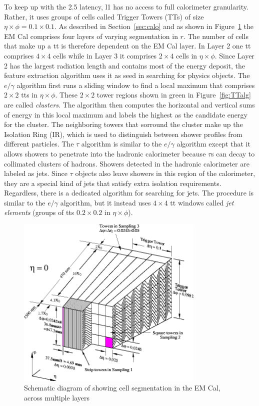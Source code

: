 \par To keep up with the \SI{2.5}{\micron} latency, \acrshort{l1} has no access to full calorimeter granularity.
Rather, it uses groups of cells called Trigger Towers (TTs) of size $\eta\times\phi = 0.1\times0.1$. 
As described in Section~\ref{sec:calo} and as shown in Figure~\ref{fig:emCalSeg} the EM Cal 
comprises four layers of varying segmentation in $r$. The number of cells that make up a \acrshort{tt} 
is therefore dependent on the EM Cal layer. In Layer 2 one \acrshort{tt} comprises $4\times 4$ cells while in 
Layer 3 it comprises $2\times 4$ cells in $\eta\times\phi$. Since Layer 2 has the largest radiation length and 
contains most of the energy deposit, the feature extraction algorithm uses it as seed in searching for physics 
objects. The $e/\gamma$ algorithm first runs a sliding window to 
find a local maximum that comprises $2\times 2$ \acrshort{tt}s in $\eta\times\phi$. 
These $2\times 2$ tower regions shown in green in Figure~\ref{fig:TTalg} 
are called {\it clusters}. The algorithm then computes the horizontal and vertical sums of energy 
in this local maximum and labels the highest as the candidate energy for the cluster. 
The neighboring towers that sorround the cluster make up the Isolation Ring (IR), which is used to 
distinguish between shower profiles from different particles. The $\tau$ algorithm is 
similar to the $e/\gamma$ algorithm except that it allows showers to penetrate into the hadronic 
calorimeter because $\tau$s can decay to collimated clusters of hadrons.   
Showers detected in the hadronic calorimeter are 
labeled as jets. Since $\tau$ objects also leave showers in this region of the calorimeter, they are a special 
kind of jets that satisfy extra isolation requirements. Regardless, there is a dedicated algorithm for searching 
for jets. The procedure is similar to the $e/\gamma$ algorithm, 
but it instead uses $4\times 4$ \acrshort{tt} windows called {\it jet elements} 
(groups of \acrshort{tt}s $0.2\times 0.2$ in $\eta\times\phi$).   

\begin{figure}[!h]
\centering
   \includegraphics[width=0.8\textwidth]{figures/emCalSeg.png}
	\caption{Schematic diagram of showing cell segmentation in the EM Cal, across multiple layers}
	\label{fig:emCalSeg}
\end{figure}

